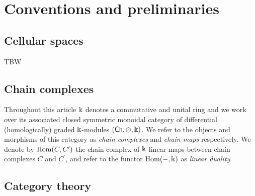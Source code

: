 
\section{Conventions and preliminaries} \label{s:preliminaries}

\subsection{Cellular spaces}

TBW

\subsection{Chain complexes}

Throughout this article $\Bbbk$ denotes a commutative and unital ring and we work over its associated closed symmetric monoidal category of differential (homologically) graded $\Bbbk$-modules $(\mathsf{Ch}, \otimes, \Bbbk)$.
We refer to the objects and morphisms of this category as \textit{chain complexes} and \textit{chain maps} respectively. We denote by $\mathrm{Hom}(C, C^\prime)$ the chain complex of $\Bbbk$-linear maps between chain complexes $C$ and $C^\prime$, and refer to the functor $\mathrm{Hom}(-, \Bbbk)$ as \textit{linear duality}.

\subsection{Category theory}

